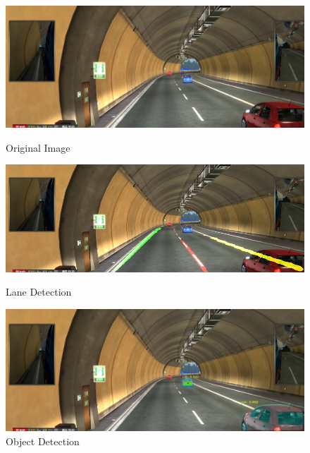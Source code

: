 \documentclass[runningheads]{llncs}
\begin{document}
\begin{figure}[!htb]
	\includegraphics[width=\linewidth]{result/w000107.jpg}
	\caption{Original Image}\label{fig:Original_Image}
	\endminipage\hfill
	\includegraphics[width=\linewidth]{result/w000107-lane.jpg}
	\caption{Lane Detection}\label{fig:Lane_Line_Result}
	\endminipage\hfill
	\includegraphics[width=\linewidth]{result/w000107-obj.jpg}
	\caption{Object Detection}\label{fig:Object_result}
	\endminipage
\end{figure}
\end{document}
